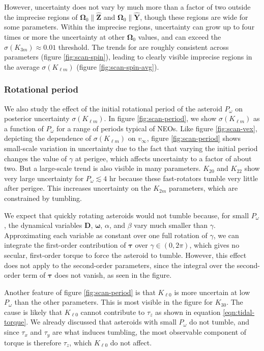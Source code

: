 \documentclass[fleqn,usenatbib]{mnras}
\newcommand{\unit}[1]{\bm{\hat{#1}}}
\begin{document}
However, uncertainty does not vary by much more than a factor of two outside the imprecise regions of $\bm \Omega_0 \parallel \unit Z$ and $\bm \Omega_0 \parallel \unit Y$, though these regions are wide for some parameters. Within the imprecise regions, uncertainty can grow up to four times or more the uncertainty at other $\bm \Omega_0$ values, and can exceed the $\sigma(K_{3 m}) \approx 0.01$ threshold. The trends for are roughly consistent across parameters (figure \ref{fig:scan-spin}), leading to clearly visible imprecise regions in the average $\sigma(K_{\ell m})$ (figure \ref{fig:scan-spin-avg}).



\subsubsection{Rotational period}
\label{sec:scan-period}

We also study the effect of the initial rotational period of the asteroid $P_\omega$ on posterior uncertainty $\sigma(K_{\ell m})$. In figure \ref{fig:scan-period}, we show $\sigma(K_{\ell m})$ as a function of $P_\omega$ for a range of periods typical of NEOs. Like figure \ref{fig:scan-vex}, depicting the dependence of $\sigma(K_{\ell m})$ on $v_\infty$, figure \ref{fig:scan-period} shows small-scale variation in uncertainty due to the fact that varying the initial period changes the value of $\gamma$ at perigee, which affects uncertainty to a factor of about two. But a large-scale trend is also visible in many parameters. $K_{20}$ and $K_{22}$ show very large uncertainty for $P_\omega \lesssim 4$ hr because these fast-rotators tumble very little after perigee. This increases uncertainty on the $K_{2m}$ parameters, which are constrained by tumbling.

We expect that quickly rotating asteroids would not tumble because, for small $P_\omega$, the dynamical variables $\bm D$, $\bm \omega$, $\alpha$, and $\beta$ vary much smaller than $\gamma$. Approximating each variable as constant over one full rotation of $\gamma$, we can integrate the first-order contribution of $\bm \tau$ over $\gamma \in (0, 2\pi)$, which gives no secular, first-order torque to force the asteroid to tumble. However, this effect does not apply to the second-order parameters, since the integral over the second-order term of $\bm \tau$ does not vanish, as seen in the figure.

Another feature of figure \ref{fig:scan-period} is that $K_{\ell 0}$ is more uncertain at low $P_\omega$ than the other parameters. This is most visible in the figure for $K_{30}$. The cause is likely that $K_{\ell 0}$ cannot contribute to $\tau_z$ as shown in equation \ref{eqn:tidal-torque}. We already discussed that asteroids with small $P_\omega$ do not tumble, and since $\tau_x$ and $\tau_y$ are what induces tumbling, the most observable component of torque is therefore $\tau_z$, which $K_{\ell 0}$ do not affect.
\end{document}

